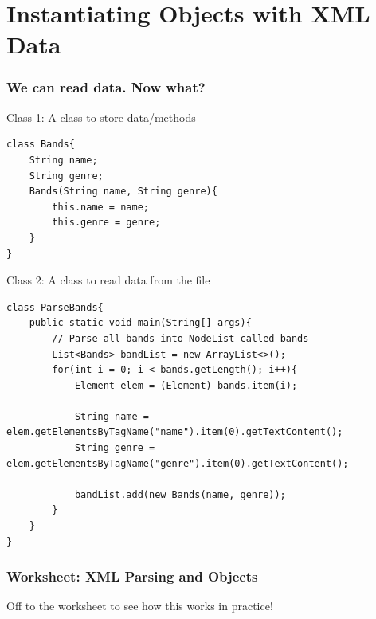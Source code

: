 \documentclass{beamer}
\begin{document}
\section{Instantiating Objects with XML Data}
\begin{frame}[fragile]
    \frametitle{We can read data. Now what?}
        Class 1: A class to store data/methods
        \begin{lstlisting}[basicstyle=\tiny]
class Bands{
    String name;
    String genre;
    Bands(String name, String genre){
        this.name = name;
        this.genre = genre;
    }
}
        \end{lstlisting}
        \vfill
        Class 2: A class to read data from the file
        \begin{lstlisting}[basicstyle=\tiny]
class ParseBands{
    public static void main(String[] args){
        // Parse all bands into NodeList called bands
        List<Bands> bandList = new ArrayList<>();
        for(int i = 0; i < bands.getLength(); i++){
            Element elem = (Element) bands.item(i); 

            String name = elem.getElementsByTagName("name").item(0).getTextContent();
            String genre = elem.getElementsByTagName("genre").item(0).getTextContent();

            bandList.add(new Bands(name, genre));
        }
    }
}
        \end{lstlisting}
\end{frame}

\begin{frame}[fragile]
    \frametitle{Worksheet: XML Parsing and Objects}
    Off to the worksheet to see how this works in practice!
\end{frame}
\end{document}
